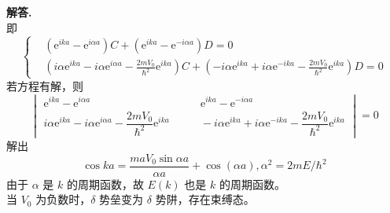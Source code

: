 \documentclass[11pt]{ctexart}
\newenvironment{solution}{\par\noindent\textbf{解答. }}{\par}
\begin{document}
\begin{solution}
\begin{equation*}
    \end{equation*}
    即
    \begin{equation*}
        \left\{
            \begin{aligned}
                &(\text{e}^{ika} - \text{e}^{i\alpha a})C + (\text{e}^{ika} - \text{e}^{-i\alpha a})D = 0 \\
                &(i\alpha\text{e}^{ika} - i\alpha\text{e}^{i\alpha a} - \frac{2mV_0}{\hbar^2}\text{e}^{ika})C + (-i\alpha\text{e}^{ika} + i\alpha\text{e}^{-ika} - \frac{2mV_0}{\hbar^2}\text{e}^{ika})D = 0
            \end{aligned}
        \right.
    \end{equation*}
    若方程有解，则
    \begin{equation*}
        \begin{vmatrix}
            \text{e}^{ika} - \text{e}^{i\alpha a} & \qquad \text{e}^{ika} - \text{e}^{-i\alpha a} \\[12pt]
            i\alpha\text{e}^{ika} - i\alpha\text{e}^{i\alpha a} - \dfrac{2mV_0}{\hbar^2}\text{e}^{ika} & \qquad -i\alpha\text{e}^{ika} + i\alpha\text{e}^{-ika} - \dfrac{2mV_0}{\hbar^2}\text{e}^{ika}
        \end{vmatrix}
        = 0
    \end{equation*}
    解出
    \begin{equation*}
        \cos{ka} = \dfrac{maV_0\sin{\alpha a}}{\alpha a} + \cos{(\alpha a)}, \alpha^2 = 2mE/\hbar^2
    \end{equation*}
    由于 $\alpha$ 是 $k$ 的周期函数，故 $E(k)$ 也是 $k$ 的周期函数。 \\
    当 $V_0$ 为负数时，$\delta$ 势垒变为 $\delta$ 势阱，存在束缚态。
\end{solution}
\end{document}
